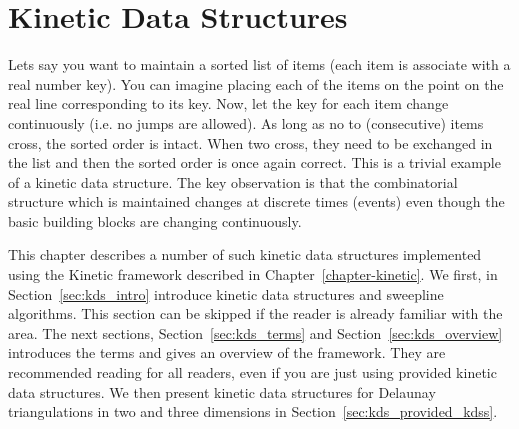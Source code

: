 

\chapter{Kinetic Data Structures}
\label{chapter-kds}


%

\minitoc



\def\note#1{$\langle\langle${\bf #1}$\rangle\rangle$}


%

Lets say you want to maintain a sorted list of items (each item is
associate with a real number key). You can imagine placing each of the
items on the point on the real line corresponding to its key. Now, let
the key for each item change continuously (i.e. no jumps are allowed).
As long as no to (consecutive) items cross, the sorted order is
intact. When two cross, they need to be exchanged in the list and then
the sorted order is once again correct. This is a trivial example of a
kinetic data structure. The key observation is that the combinatorial
structure which is maintained changes at discrete times (events) even
though the basic building blocks are changing continuously.

This chapter describes a number of such kinetic data structures
implemented using the Kinetic framework described in
Chapter~\ref{chapter-kinetic}. We first, in
Section~\ref{sec:kds_intro} introduce kinetic data structures and
sweepline algorithms. This section can be skipped if the reader is
already familiar with the area. The next sections,
Section~\ref{sec:kds_terms} and Section~\ref{sec:kds_overview} introduces
the terms and gives an overview of the framework. They are recommended
reading for all readers, even if you are just using provided kinetic
data structures. We then present kinetic data structures for Delaunay
triangulations in two and three dimensions in
Section~\ref{sec:kds_provided_kdss}.









